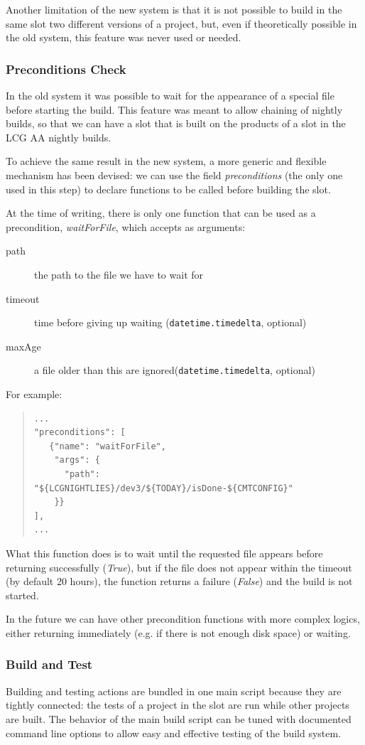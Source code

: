 \documentclass{lhcbnote}
\begin{document}
Another limitation of the new system is that it is not possible to build in the
same slot two different versions of a project, but, even if theoretically
possible in the old system, this feature was never used or needed.

\subsubsection{Preconditions Check}
\label{CoreTools:Preconditions}
In the old system it was possible to wait for the appearance of a special file
before starting the build.  This feature was meant to allow chaining of nightly
builds, so that we can have a slot that is built on the products of a slot in
the LCG AA nightly builds.

To achieve the same result in the new system, a more generic and flexible
mechanism has been devised: we can use the field \emph{preconditions} (the only
one used in this step) to declare functions to be called before building the
slot.

At the time of writing, there is only one function that can be used as a
precondition, \emph{waitForFile}, which accepts as arguments:
\begin{description}
  \item[path] the path to the file we have to wait for
  \item[timeout] time before giving up waiting (\texttt{datetime.timedelta},
  optional)
  \item[maxAge] a file older than this are ignored(\texttt{datetime.timedelta},
  optional)
\end{description}
For example:
\begin{quote}
\begin{verbatim}
...
"preconditions": [
   {"name": "waitForFile",
    "args": {
      "path": "${LCGNIGHTLIES}/dev3/${TODAY}/isDone-${CMTCONFIG}"
    }}
],
...
\end{verbatim}
\end{quote}
What this function does is to wait until the requested file appears before
returning successfully (\emph{True}), but if the file does not appear within the
timeout (by default 20 hours), the function returns a failure (\emph{False}) and
the build is not started.

In the future we can have other precondition functions with more complex logics,
either returning immediately (e.g. if there is not enough disk space) or
waiting.

\subsubsection{Build and Test}
\label{CoreTools:Build}
Building and testing actions are bundled in one main script because they are
tightly connected: the tests of a project in the slot are run while other
projects are built.  The behavior of the main build script can be tuned with
documented command line options to allow easy and effective testing of the build
system.
\end{document}
